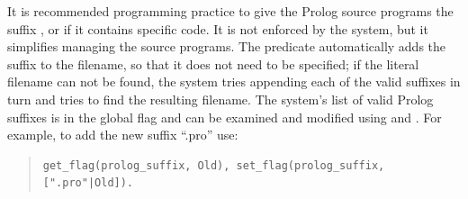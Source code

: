 It is recommended programming practice to give the Prolog source programs
the suffix , or  if it contains {\eclipse} specific
code.
It is not enforced by the system, but it simplifies managing the source
programs.
The  predicate
automatically adds the suffix to the
filename, so that it does not need to be specified;
if the literal filename can not be found, the system tries appending
each of the valid suffixes in turn and tries to find the resulting filename.
The system's list of valid Prolog suffixes is in the global flag
 and can be examined and modified
using  and
.
For example, to add the new suffix ``.pro'' use:
\begin{quote}
\begin{verbatim}
get_flag(prolog_suffix, Old), set_flag(prolog_suffix, [".pro"|Old]).
\end{verbatim}
\end{quote}

